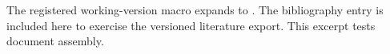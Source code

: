The registered working-version macro expands to \workingversion.
The bibliography entry \cite{Edwards1974} is included here to exercise
the versioned literature export. This excerpt tests document assembly.
